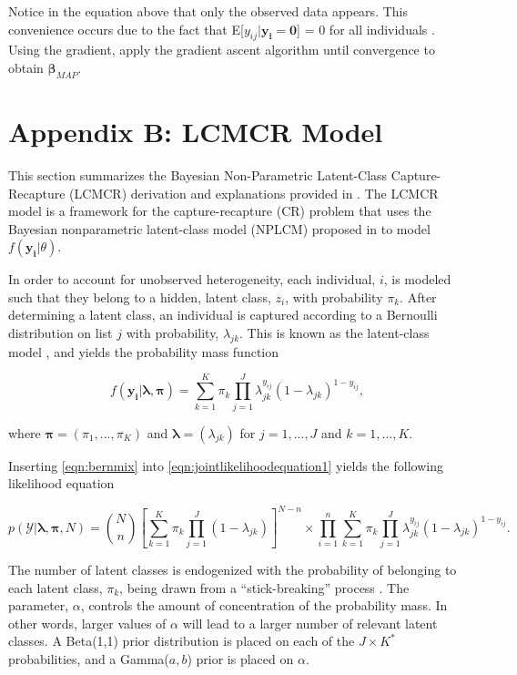 \documentclass[
  12pt,
]{article}
\begin{document}
Notice in the equation above that only the observed data appears. This
convenience occurs due to the fact that
E{[}\(y_{ij}|\boldsymbol{y_i}= \boldsymbol{0}\){]} = 0 for all
individuals \citep{alho_logistic_1990}. Using the gradient, apply the
gradient ascent algorithm until convergence to obtain
\(\boldsymbol{\beta}_{MAP}\).

\section{Appendix B: LCMCR Model}
\label{LCMCRmodel}

This section summarizes the Bayesian Non-Parametric Latent-Class
Capture-Recapture (LCMCR) derivation and explanations provided in
\cite{manriquevallier_bayesian_2016}. The LCMCR model is a framework for
the capture-recapture (CR) problem that uses the Bayesian nonparametric
latent-class model (NPLCM) proposed in \cite{dunson_nonparametric_2009}
to model \(f(\boldsymbol{y_i}|\theta)\).

In order to account for unobserved heterogeneity, each individual,
\(i\), is modeled such that they belong to a hidden, latent class,
\(z_i\), with probability \(\pi_k\). After determining a latent class,
an individual is captured according to a Bernoulli distribution on list
\(j\) with probability, \(\lambda_{jk}\). This is known as the
latent-class model \citep{goodman_exploratory_1974}, and yields the
probability mass function

\begin{equation}
\label{eqn:bernmix}
f(\boldsymbol{y_i}|\boldsymbol{\lambda,\pi}) = \sum_{k=1}^K \pi_k \prod_{j=1}^J \lambda_{jk}^{y_{ij}}(1-\lambda_{jk})^{1-y_{ij}},
\end{equation}

where \(\boldsymbol{\pi}=(\pi_1,...,\pi_K)\) and
\(\boldsymbol{\lambda} = (\lambda_{jk})\) for \(j=1,...,J\) and
\(k=1,...,K\).

Inserting \autoref{eqn:bernmix} into
\autoref{eqn:jointlikelihoodequation1} yields the following likelihood
equation

\begin{equation}
\label{eqn:LCMCRlikelihood}
p(\mathcal{Y}|\boldsymbol{\lambda},\boldsymbol{\pi},N)=\binom{N}{n} \left[ \sum_{k=1}^K \pi_k \prod_{j=1}^J (1-\lambda_{jk}) \right]^{N-n} \times \prod_{i=1}^n \sum_{k=1}^K \pi_k \prod_{j=1}^J \lambda_{jk}^{y_{ij}}(1-\lambda_{jk})^{1-y_{ij}}.
\end{equation}

The number of latent classes is endogenized with the probability of
belonging to each latent class, \(\pi_k\), being drawn from a
``stick-breaking'' process \citep{sethuraman_constructive_1991}. The
parameter, \(\alpha\), controls the amount of concentration of the
probability mass. In other words, larger values of \(\alpha\) will lead
to a larger number of relevant latent classes. A Beta(1,1) prior
distribution is placed on each of the \(J \times K^*\) probabilities,
and a Gamma(\(a,b\)) prior is placed on \(\alpha\).
\end{document}
